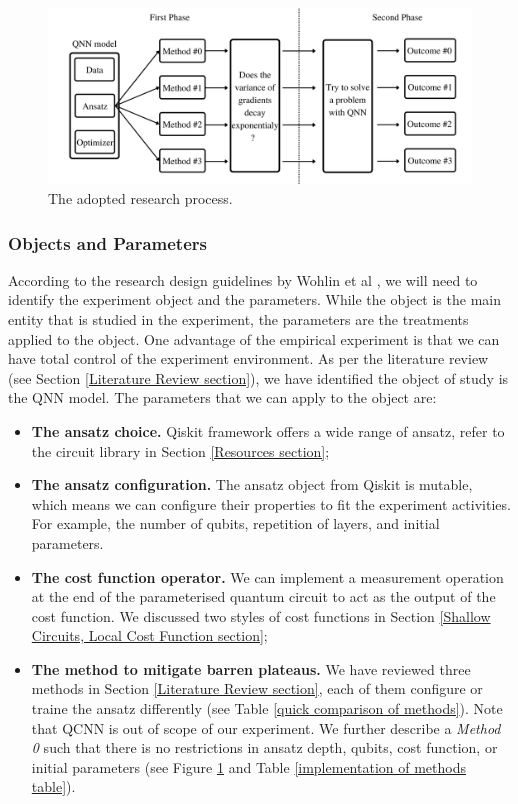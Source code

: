 \begin{figure}
    \centering
    \includegraphics[width=\textwidth]{./ResearchDesign/Appendices/ExperimentDiagram.png}
    \caption{
        The adopted research process.
    }
    \label{Research Activities Figure}
\end{figure}

\subsubsection{Objects and Parameters}\label{Objects section}
According to the research design guidelines by Wohlin et al \cite{wohlinExperimentationSoftwareEngineering2012}, we will need to identify the experiment object and the parameters.
While the object is the main entity that is studied in the experiment, the parameters are the treatments applied to the object.
One advantage of the empirical experiment is that we can have total control of the experiment environment.
As per the literature review (see Section \ref{Literature Review section}), we have identified the object of study is the QNN model.
The parameters that we can apply to the object are:
\begin{itemize}
    \item \textbf{The ansatz choice.} Qiskit framework offers a wide range of ansatz, refer to the circuit library in Section \ref{Resources section};
    \item \textbf{The ansatz configuration.} The ansatz object from Qiskit is mutable, which means we can configure their properties to fit the experiment activities. For example, the number of qubits, repetition of layers, and initial parameters.
    \item \textbf{The cost function operator.} We can implement a measurement operation at the end of the parameterised quantum circuit to act as the output of the cost function. We discussed two styles of cost functions in Section \ref{Shallow Circuits, Local Cost Function section};
    \item \textbf{The method to mitigate barren plateaus.} We have reviewed three methods in Section \ref{Literature Review section}, each of them configure or traine the ansatz differently (see Table \ref{quick comparison of methods}). Note that QCNN is out of scope of our experiment. We further describe a \emph{Method 0} such that there is no restrictions in ansatz depth, qubits, cost function, or initial parameters (see Figure \ref{Research Activities Figure} and Table \ref{implementation of methods table}).
\end{itemize}

